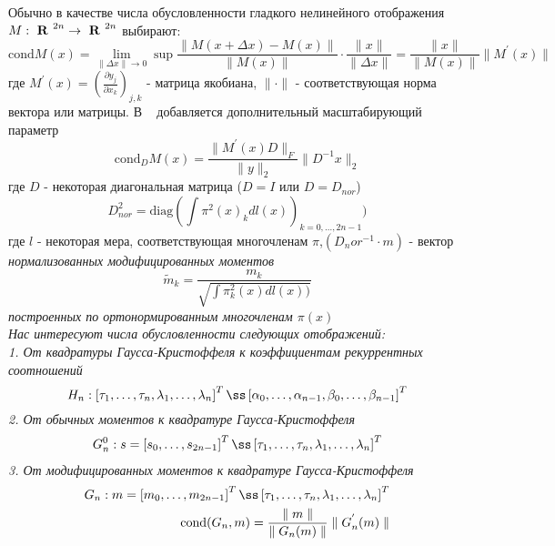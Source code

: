 Обычно в качестве числа обусловленности гладкого нелинейного
отображения $M:\mbox{ \bf R \rm}^{2n} \rightarrow \mbox{ \bf R \rm}^{2n}$
выбирают:
\begin{equation}
\mbox{cond} M(x) = \lim\limits_{\parallel \Delta x \parallel \rightarrow 0} \sup
\frac{\parallel M(x+\Delta x)-M(x) \parallel}
{\parallel M(x) \parallel}\cdot
\frac{\parallel x \parallel}
{\parallel \Delta x \parallel}=
\frac{\parallel x \parallel}
{\parallel M(x) \parallel}
\parallel M^{'}(x) \parallel
\end{equation}
где $M^{'}(x)=\left( \frac{\partial y_j} {\partial x_k}
\right)_{j,k}$ - матрица якобиана, $\parallel \cdot \parallel$ -
соответствующая норма вектора или матрицы. В ~\cite{Beckermann1}
добавляется дополнительный масштабирующий параметр
\begin{equation}
\mbox{cond}_D M(x)=\frac{\parallel M^{'}(x)D \parallel_F}
{\parallel y \parallel_2}
\parallel D^{-1}x \parallel_2
\end{equation}
где $D$ - некоторая диагональная матрица ($D=I$ или $D=D_{nor}$)
\begin{equation}
D^2_{nor}=\mbox{diag}(\int\pi^2(x)_k dl(x))_{k=0,\ldots,2n-1})
\end{equation}
где $l$ - некоторая мера, соответствующая многочленам
$\pi$,$(D_nor^{-1}\cdot m)$ -
вектор \it нормализованных \rm модифицированных моментов
\begin{equation}
\tilde{m}_k=\displaystyle \frac{m_k}{\sqrt{\int\pi_k^2(x) dl(x))}}
\end{equation}
построенных по ортонормированным многочленам $\pi(x)$
\\
Нас интересуют числа обусловленности следующих отображений: \\
1. От квадратуры Гаусса-Кристоффеля к коэффициентам рекуррентных соотношений
\begin{equation}
H_n:\left[\tau_1,\ldots, \tau_n,\lambda_1,\ldots,\lambda_n \right]^{T}\ss\left[\alpha_0,\ldots,\alpha_{n-1},\beta_0,\ldots,\beta_{n-1}\right]^{T}
\end{equation}
2. От обычных моментов к квадратуре Гаусса-Кристоффеля
\begin{eqnarray}
G_n^{0}:s=\left[s_0,\ldots,s_{2n-1}\right]^{T} \ss \left[\tau_1,\ldots, \tau_n,\lambda_1,\ldots,\lambda_n \right]^{T} \nonumber
\end{eqnarray}
3. От модифицированных моментов к квадратуре Гаусса-Кристоффеля
\begin{eqnarray}
G_n:m=\left[m_0,\ldots,m_{2n-1}\right]^{T} \ss \left[\tau_1,\ldots, \tau_n,\lambda_1,\ldots,\lambda_n \right]^{T} \nonumber \\
\mbox{cond}(G_n,m)=\frac{\parallel m \parallel}{\parallel G_n(m)\parallel}\parallel G_n^{'}(m) \parallel \nonumber
\end{eqnarray}
